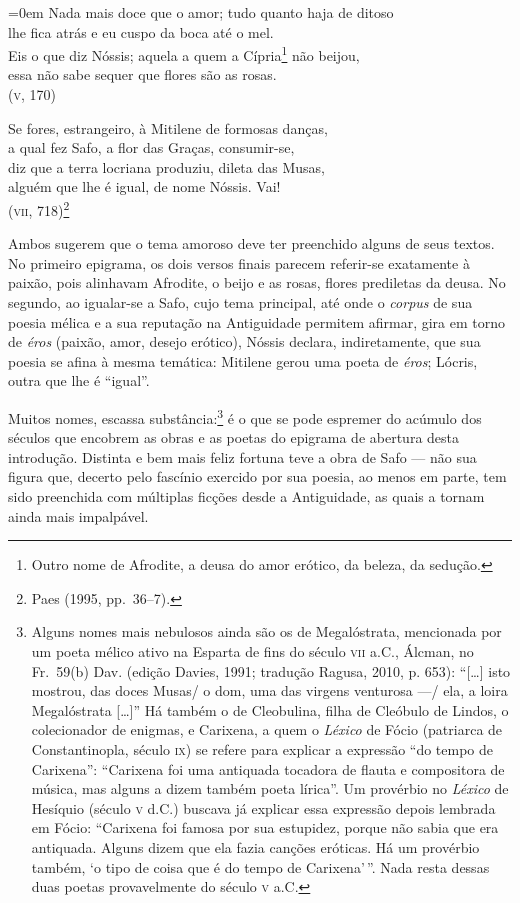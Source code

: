 \begin{hedraquote}\parindent=0em
Nada mais doce que o amor; tudo quanto haja de ditoso\\
lhe fica atrás e eu cuspo da boca até o mel.\\
Eis o que diz Nóssis; aquela a quem a Cípria\footnote{ Outro nome de
Afrodite, a deusa do amor erótico, da beleza, da sedução.} não beijou,\\
essa não sabe sequer que flores são as rosas.\\
\mbox{}\hfill (\textsc{v}, 170)

\smallskip

Se fores, estrangeiro, à Mitilene de formosas danças,\\
a qual fez Safo, a flor das Graças, consumir-se,\\ 
diz que a terra locriana produziu, dileta das Musas,\\
alguém que lhe é igual, de nome Nóssis. Vai!\\
\mbox{}\hfill (\textsc{vii}, 718)\footnote{ Paes (1995, pp.~36--7).}
\end{hedraquote}

Ambos sugerem que o tema amoroso deve ter preenchido alguns de seus textos. No
primeiro epigrama, os dois versos finais parecem referir-se exatamente à
paixão, pois alinhavam Afrodite, o beijo e as rosas, flores prediletas da
deusa. No segundo, ao igualar-se a Safo, cujo tema principal, até onde o
\textit{corpus} de sua poesia mélica e a sua reputação na Antiguidade permitem
afirmar, gira em torno de \textit{éros} (paixão, amor, desejo erótico), Nóssis
declara, indiretamente, que sua poesia se afina à mesma temática: Mitilene
gerou uma poeta de \textit{éros}; Lócris, outra que lhe é ``igual”.

Muitos nomes, escassa substância:\footnote{ Alguns nomes mais nebulosos ainda são
os de Megalóstrata, mencionada por um poeta mélico ativo na Esparta de fins do
século \textsc{vii} a.C., Álcman, no Fr.~59(b) Dav. (edição Davies, 1991;
tradução Ragusa, 2010, p. 653): ``[\ldots{}] isto mostrou, das doces
Musas/ o dom, uma das virgens venturosa ---/ ela, a loira Megalóstrata [\ldots{}]'' Há
também o de Cleobulina, filha de Cleóbulo de Lindos, o colecionador de enigmas,
e Carixena, a quem o \textit{Léxico} de Fócio (patriarca de Constantinopla,
século \textsc{ix}) se refere para explicar a expressão ``do tempo de Carixena”:
``Carixena foi uma antiquada tocadora de flauta e compositora de música,
mas alguns a dizem também poeta lírica”. Um provérbio no \textit{Léxico} de
Hesíquio (século \textsc{v} d.C.) buscava já explicar essa expressão depois lembrada em
Fócio: ``Carixena foi famosa por sua estupidez, porque não sabia que era
antiquada. Alguns dizem que ela fazia canções eróticas. Há um provérbio também,
‘o tipo de coisa que é do tempo de Carixena’\,”. Nada resta dessas duas poetas
provavelmente do século \textsc{v} a.C.} é o que se pode espremer do acúmulo dos
séculos que encobrem as obras e as poetas do epigrama de abertura desta
introdução. Distinta e bem mais feliz fortuna teve a obra de Safo --- não sua
figura que, decerto pelo fascínio exercido por sua poesia, ao menos em parte,
tem sido preenchida com múltiplas ficções desde a Antiguidade, as quais a
tornam ainda mais impalpável. 

